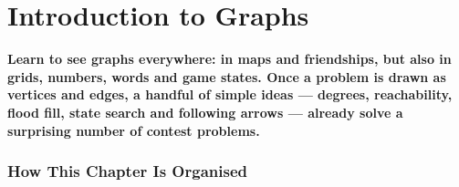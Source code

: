 %
\chapter{Introduction to Graphs}
\label{ch:introduction}

\begin{tcolorbox}[enhanced, colback=white, colframe=secondaryblue, boxrule=1pt, arc=2mm,
                  left=10pt, right=10pt]
\textbf{\large\textcolor{primaryblue}{Learn to see graphs everywhere: in maps and friendships, but also in grids, numbers, words and game states. Once a problem is drawn as vertices and edges, a handful of simple ideas --- degrees, reachability, flood fill, state search and following arrows --- already solve a surprising number of contest problems.}}
\end{tcolorbox}


\subsection*{How This Chapter Is Organised}

